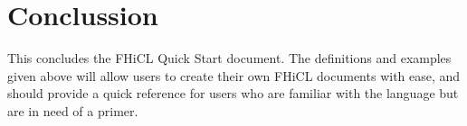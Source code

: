 \documentclass{article}
\begin{document}
\section{Conclussion}
	This concludes the FHiCL Quick Start document. 
	The definitions and examples given above will allow users to create their own FHiCL documents with ease,
	and should provide a quick reference for users who are familiar with the language but are in need of a primer.
\end{document}

